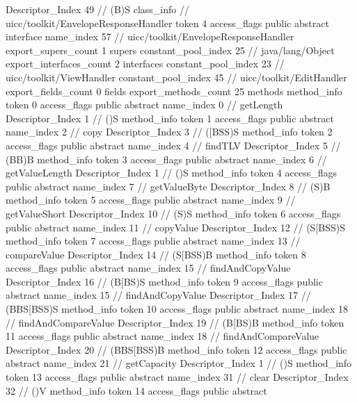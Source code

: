 {{{{{					Descriptor_Index	49		// (B)S
				}
			}
		}
		class_info {		// uicc/toolkit/EnvelopeResponseHandler
			token	4
			access_flags	public abstract interface
			name_index	57		// uicc/toolkit/EnvelopeResponseHandler
			export_supers_count	1
			supers {
				constant_pool_index	25		// java/lang/Object
			}
			export_interfaces_count	2
			interfaces {
				constant_pool_index	23		// uicc/toolkit/ViewHandler
				constant_pool_index	45		// uicc/toolkit/EditHandler
			}
			export_fields_count	0
			fields {
			}
			export_methods_count	25
			methods {
				method_info {
					token	0
					access_flags	public abstract
					name_index	0		// getLength
					Descriptor_Index	1		// ()S
				}
				method_info {
					token	1
					access_flags	public abstract
					name_index	2		// copy
					Descriptor_Index	3		// ([BSS)S
				}
				method_info {
					token	2
					access_flags	public abstract
					name_index	4		// findTLV
					Descriptor_Index	5		// (BB)B
				}
				method_info {
					token	3
					access_flags	public abstract
					name_index	6		// getValueLength
					Descriptor_Index	1		// ()S
				}
				method_info {
					token	4
					access_flags	public abstract
					name_index	7		// getValueByte
					Descriptor_Index	8		// (S)B
				}
				method_info {
					token	5
					access_flags	public abstract
					name_index	9		// getValueShort
					Descriptor_Index	10		// (S)S
				}
				method_info {
					token	6
					access_flags	public abstract
					name_index	11		// copyValue
					Descriptor_Index	12		// (S[BSS)S
				}
				method_info {
					token	7
					access_flags	public abstract
					name_index	13		// compareValue
					Descriptor_Index	14		// (S[BSS)B
				}
				method_info {
					token	8
					access_flags	public abstract
					name_index	15		// findAndCopyValue
					Descriptor_Index	16		// (B[BS)S
				}
				method_info {
					token	9
					access_flags	public abstract
					name_index	15		// findAndCopyValue
					Descriptor_Index	17		// (BBS[BSS)S
				}
				method_info {
					token	10
					access_flags	public abstract
					name_index	18		// findAndCompareValue
					Descriptor_Index	19		// (B[BS)B
				}
				method_info {
					token	11
					access_flags	public abstract
					name_index	18		// findAndCompareValue
					Descriptor_Index	20		// (BBS[BSS)B
				}
				method_info {
					token	12
					access_flags	public abstract
					name_index	21		// getCapacity
					Descriptor_Index	1		// ()S
				}
				method_info {
					token	13
					access_flags	public abstract
					name_index	31		// clear
					Descriptor_Index	32		// ()V
				}
				method_info {
					token	14
					access_flags	public abstract
}}}}}
